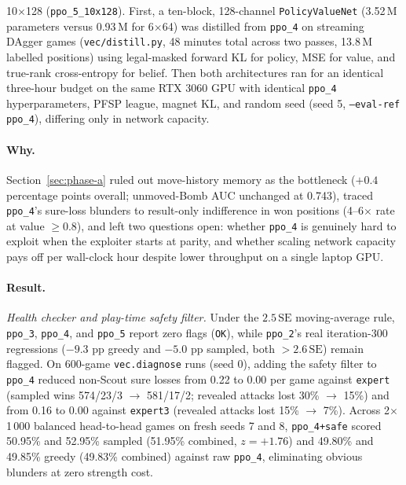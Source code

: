 \begin{enumerate}
{        10$\times$128 (\texttt{ppo\_5\_10x128})}. First, a ten-block, 128-channel
        \texttt{PolicyValueNet} (3.52\,M parameters versus 0.93\,M for 6$\times$64) was distilled
        from \texttt{ppo\_4} on streaming DAgger games (\texttt{vec/distill.py}, 48 minutes total
        across two passes, 13.8\,M labelled positions) using legal-masked forward KL for policy,
        MSE for value, and true-rank cross-entropy for belief. Then both architectures ran for an
        identical three-hour budget on the same RTX 3060 GPU with identical \texttt{ppo\_4}
        hyperparameters, PFSP league, magnet KL, and random seed (seed 5, \texttt{--eval-ref}
        \texttt{ppo\_4}), differing only in network capacity.
\end{enumerate}

\paragraph{Why.} Section~\ref{sec:phase-a} ruled out move-history memory as the bottleneck
($+0.4$ percentage points overall; unmoved-Bomb AUC unchanged at 0.743), traced \texttt{ppo\_4}'s
sure-loss blunders to result-only indifference in won positions (4--6$\times$ rate at value
$\ge 0.8$), and left two questions open: whether \texttt{ppo\_4} is genuinely hard to exploit when
the exploiter starts at parity, and whether scaling network capacity pays off per wall-clock hour
despite lower throughput on a single laptop GPU.

\paragraph{Result.} \emph{Health checker and play-time safety filter.} Under the $2.5\,\mathrm{SE}$
moving-average rule, \texttt{ppo\_3}, \texttt{ppo\_4}, and \texttt{ppo\_5} report zero flags
(\texttt{OK}), while \texttt{ppo\_2}'s real iteration-300 regressions ($-9.3$ pp greedy and $-5.0$
pp sampled, both $> 2.6\,\mathrm{SE}$) remain flagged. On 600-game \texttt{vec.diagnose} runs
(seed 0), adding the safety filter to \texttt{ppo\_4} reduced non-Scout sure losses from 0.22 to
0.00 per game against \texttt{expert} (sampled wins 574/23/3 $\to$ 581/17/2; revealed attacks lost
30\% $\to$ 15\%) and from 0.16 to 0.00 against \texttt{expert3} (revealed attacks lost 15\% $\to$
7\%). Across 2$\times$1\,000 balanced head-to-head games on fresh seeds 7 and 8,
\texttt{ppo\_4+safe} scored 50.95\% and 52.95\% sampled (51.95\% combined, $z = +1.76$) and 49.80\%
and 49.85\% greedy (49.83\% combined) against raw \texttt{ppo\_4}, eliminating obvious blunders at
zero strength cost.

